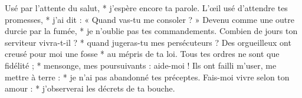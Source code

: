 Usé par l’attente du salut, *
j’espère encore ta parole.
\versseparator
L’œil usé d’attendre tes promesses, *
j’ai dit : « Quand vas-tu me consoler ? »
\versseparator
Devenu comme une outre durcie par la fumée, *
je n’oublie pas tes commandements.
\versseparator
Combien de jours ton serviteur vivra-t-il ? *
quand jugeras-tu mes persécuteurs ?
\versseparator
Des orgueilleux ont creusé pour moi une fosse *
au mépris de ta loi.
\versseparator
Tous tes ordres ne sont que fidélité ; *
mensonge, mes poursuivants : aide-moi !
\versseparator
Ils ont failli m’user, me mettre à terre : *
je n’ai pas abandonné tes préceptes.
\versseparator
Fais-moi vivre selon ton amour : *
j’observerai les décrets de ta bouche.
